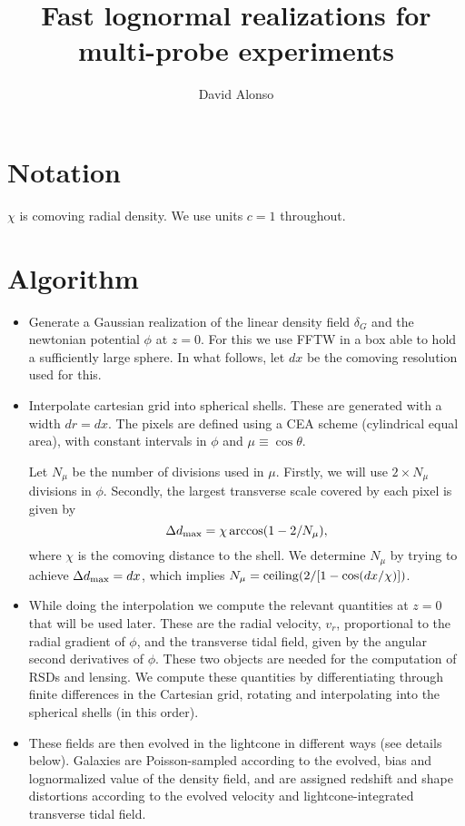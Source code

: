 \documentclass[a4paper,10pt]{article}
\title{Fast lognormal realizations for multi-probe experiments}
\author{David Alonso}
\begin{document}
\maketitle

\section{Notation}
$\chi$ is comoving radial density. We use units $c=1$ throughout.

\section{Algorithm}
  \begin{itemize}
    \item Generate a Gaussian realization of the linear density field
      $\delta_G$ and the newtonian potential $\phi$ at $z=0$. For
      this we use FFTW in a box able to hold a sufficiently large
      sphere. In what follows, let $dx$ be the comoving resolution 
      used for this.
    \item Interpolate cartesian grid into spherical shells. These
      are generated with a width $dr=dx$. The pixels are defined
      using a CEA scheme (cylindrical equal area), with constant
      intervals in $\phi$ and $\mu\equiv \cos\theta$.

      Let $N_\mu$ be the number of divisions used in $\mu$. Firstly,
      we will use $2\times N_\mu$ divisions in $\phi$. Secondly,
      the largest transverse scale covered by each pixel is given by
      \begin{equation}
        \Delta d_{\rm max} = \chi\,{\rm arccos}(1-2/N_\mu),
      \end{equation}
      where $\chi$ is the comoving distance to the shell.
      We determine $N_\mu$ by trying to achieve $\Delta d_{\rm max}=dx$,
      which implies $N_\mu={\rm ceiling}(2/[1-\cos(dx/\chi)])$.
    \item While doing the interpolation we compute the relevant
      quantities at $z=0$ that will be used later. These are the radial
      velocity, $v_r$, proportional to the radial gradient of $\phi$, and
      the transverse tidal field, given by the angular second derivatives
      of $\phi$. These two objects are needed for the computation of RSDs
      and lensing. We compute these quantities by differentiating through
      finite differences in the Cartesian grid, rotating and interpolating
      into the spherical shells (in this order).
    \item These fields are then evolved in the lightcone in different
      ways (see details below). Galaxies are Poisson-sampled according
      to the evolved, bias and lognormalized value of the density 
      field, and are assigned redshift and shape distortions according
      to the evolved velocity and lightcone-integrated transverse tidal
      field.
  \end{itemize}
\end{document}
